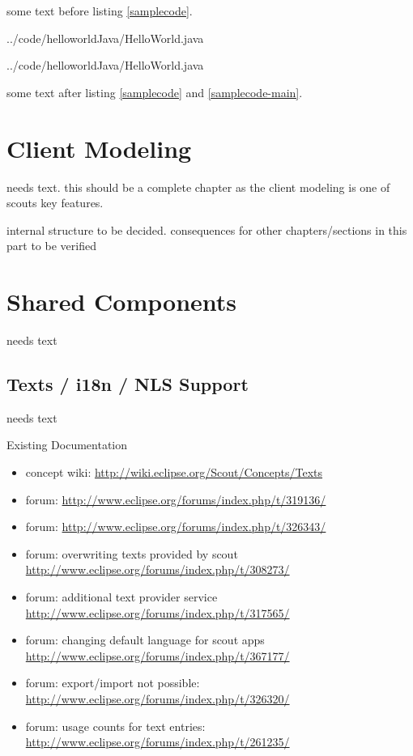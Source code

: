 \documentclass[a4paper,10pt,twoside]{book}
\begin{document}
some text before listing \ref{samplecode}.


{../code/helloworldJava/HelloWorld.java}



{../code/helloworldJava/HelloWorld.java}


some text after listing \ref{samplecode} and \ref{samplecode-main}.

\chapter{Client Modeling}

needs text. this should be a complete chapter as the client modeling is one
of scouts key features.

internal structure to be decided. consequences for other chapters/sections in
this part to be verified

\chapter{Shared Components}
needs text
  
\section{Texts / i18n / NLS Support}
needs text

\noindent Existing Documentation
\begin{itemize}
  \item concept wiki: \url{http://wiki.eclipse.org/Scout/Concepts/Texts}
  \item forum: \url{http://www.eclipse.org/forums/index.php/t/319136/}
  \item forum: \url{http://www.eclipse.org/forums/index.php/t/326343/}
  \item forum: overwriting texts provided by scout \url{http://www.eclipse.org/forums/index.php/t/308273/}
  \item forum: additional text provider service \url{http://www.eclipse.org/forums/index.php/t/317565/}
  \item forum: changing default language for scout apps \url{http://www.eclipse.org/forums/index.php/t/367177/}
  \item forum: export/import not possible: \url{http://www.eclipse.org/forums/index.php/t/326320/}
  \item forum: usage counts for text entries: \url{http://www.eclipse.org/forums/index.php/t/261235/}
\end{itemize}
\end{document}
